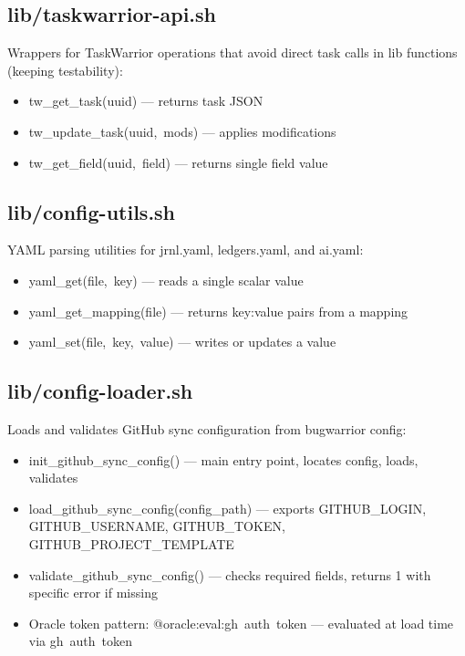 \documentclass[11pt, a4paper, DIV=14]{scrartcl}
\renewcommand{\texttt}[1]{{\ttfamily\fontsize{8.5}{10.5}\selectfont\color{BabbNavy}#1}}
\begin{document}
\subsection{lib/taskwarrior-api.sh}\label{libtaskwarrior-api.sh}

Wrappers for TaskWarrior operations that avoid direct \texttt{task}
calls in lib functions (keeping testability):

\begin{itemize}
\tightlist
\item
  \texttt{tw\_get\_task(uuid)} --- returns task JSON
\item
  \texttt{tw\_update\_task(uuid,\ mods)} --- applies modifications
\item
  \texttt{tw\_get\_field(uuid,\ field)} --- returns single field value
\end{itemize}

\subsection{lib/config-utils.sh}\label{libconfig-utils.sh}

YAML parsing utilities for jrnl.yaml, ledgers.yaml, and ai.yaml:

\begin{itemize}
\tightlist
\item
  \texttt{yaml\_get(file,\ key)} --- reads a single scalar value
\item
  \texttt{yaml\_get\_mapping(file)} --- returns key:value pairs from a
  mapping
\item
  \texttt{yaml\_set(file,\ key,\ value)} --- writes or updates a value
\end{itemize}

\subsection{lib/config-loader.sh}\label{libconfig-loader.sh}

Loads and validates GitHub sync configuration from bugwarrior config:

\begin{itemize}
\tightlist
\item
  \texttt{init\_github\_sync\_config()} --- main entry point, locates
  config, loads, validates
\item
  \texttt{load\_github\_sync\_config(config\_path)} --- exports
  \texttt{GITHUB\_LOGIN}, \texttt{GITHUB\_USERNAME},
  \texttt{GITHUB\_TOKEN}, \texttt{GITHUB\_PROJECT\_TEMPLATE}
\item
  \texttt{validate\_github\_sync\_config()} --- checks required fields,
  returns 1 with specific error if missing
\item
  Oracle token pattern: \texttt{@oracle:eval:gh\ auth\ token} ---
  evaluated at load time via \texttt{gh\ auth\ token}
\end{itemize}
\end{document}

